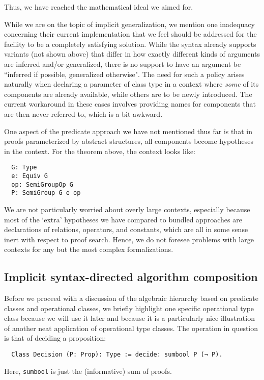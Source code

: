 \documentclass[a4paper,10pt,runningheads]{llncs}
\begin{document}
Thus, we have reached the mathematical ideal we aimed for.

While we are on the topic of implicit generalization, we mention one inadequacy concerning their current implementation that we feel should be addressed for the facility to be a completely satisfying solution. While the syntax already supports variants (not shown above) that differ in how exactly different kinds of arguments are inferred and/or generalized, there is no support to have an argument be ``inferred if possible, generalized otherwise". The need for such a policy arises naturally when declaring a parameter of class type in a context where \emph{some} of its components are already available, while others are to be newly introduced. The current workaround in these cases involves providing names for components that are then never referred to, which is a bit awkward.

One aspect of the predicate approach we have not mentioned thus far is that in proofs parameterized by abstract structures, all components become hypotheses in the context. For the theorem above, the context looks like:
\begin{lstlisting}
  G: Type
  e: Equiv G
  op: SemiGroupOp G
  P: SemiGroup G e op
\end{lstlisting}
We are not particularly worried about overly large contexts, especially because most of the `extra' hypotheses we have compared to bundled approaches are declarations of relations, operators, and constants, which are all in some sense inert with respect to proof search. Hence, we do not foresee problems with large contexts for any but the most complex formalizations.

\subsection{Implicit syntax-directed algorithm composition}

Before we proceed with a discussion of the algebraic hierarchy based on predicate classes and operational classes, we briefly highlight one specific operational type class because we will use it later and because it is a particularly nice illustration of another neat application of operational type classes. The operation in question is that of deciding a proposition:
\begin{lstlisting}
  Class Decision (P: Prop): Type := decide: sumbool P (¬ P).
\end{lstlisting}
Here, \lstinline|sumbool| is just the (informative) sum of proofs.
\end{document}
